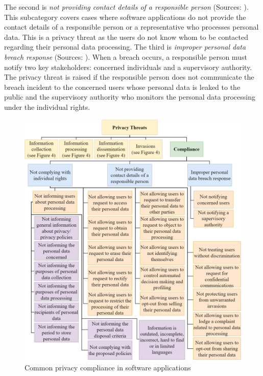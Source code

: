 The second is \emph{not providing contact details of a responsible person} (Sources: \cite{OfficeJournaloftheEuropeanUnion;2016, ISO/IEC2011}). This subcategory covers cases where software applications do not provide the contact details of a responsible person or a representative who processes personal data. This is a privacy threat as the users do not know whom to be contacted regarding their personal data processing. The third is \emph{improper personal data breach response} (Sources: \cite{OfficeJournaloftheEuropeanUnion;2016, ISO/IEC2011, HIPAA, OWASPsurvey}). When a breach occurs, a responsible person must notify two key stakeholders: concerned individuals and a supervisory authority. The privacy threat is raised if the responsible person does not communicate the breach incident to the concerned users whose personal data is leaked to the public and the supervisory authority who monitors the personal data processing under the individual rights.

\begin{figure}[ht]
	\centering
	\includegraphics[width=\linewidth]{figures/taxonomy-compliance.png}
	\caption{Common privacy compliance in software applications}
	\label{fig:AOC-compliance}
\end{figure}

